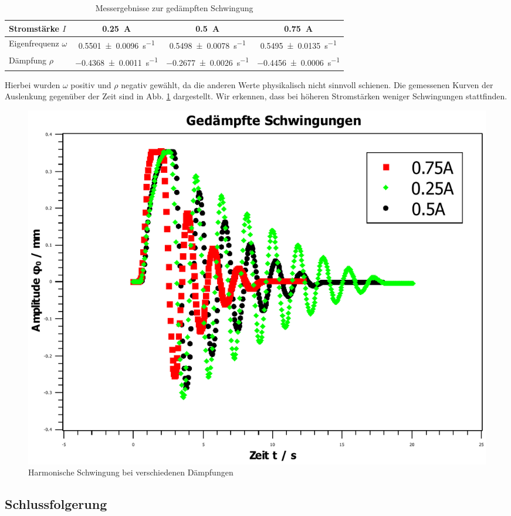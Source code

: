 \documentclass[11pt,a4paper,titlepage, ngerman]{article}
\newcommand{\refabb}[1]{Abb. \ref{abb:#1}}
\begin{document}
			\begin{table}[ht]
				\centering
				\begin{tabular}{l|S|S|S}
					\hline
					{Stromstärke $I$} & {\SI{0.25}{\A}} & {\SI{0.5}{\A}} & {\SI{0.75}{\A}} \\
					\hline
					{Eigenfrequenz $\omega$} \quad
					& \SI{0,5501+-0,0096}{\s^{-1}}	
					& \SI{0,5498+-0,0078}{\s^{-1}}
					& \SI{0,5495+-0,0135}{\s^{-1}}\\
					\hline
					{Dämpfung $\rho$}
					& \SI{-0.4368+-0,0011}{\s^{-1}}
					& \SI{-0,2677+-0,0026}{\s^{-1}}
					& \SI{-0,4456+-0,0006}{\s^{-1}} \\
					\hline
				\end{tabular}
				\caption{Messergebnisse zur gedämpften Schwingung}
				\label{tab:MessungGedämpft}
			\end{table}
			Hierbei wurden $\omega$ positiv und $\rho$ negativ gewählt, da die anderen Werte physikalisch nicht sinnvoll schienen. Die gemessenen Kurven der Auslenkung gegenüber der Zeit sind in \refabb{Dämpfung} dargestellt. Wir erkennen, dass bei höheren Stromstärken weniger Schwingungen stattfinden.
			\begin{figure}[ht]
				\includegraphics[width=\textwidth]{GedaempfteSchwingungen.pdf}
				\caption{Harmonische Schwingung bei verschiedenen Dämpfungen}
				\label{abb:Dämpfung}
			\end{figure}
				
		\subsection*{Schlussfolgerung}
			
\end{document}
